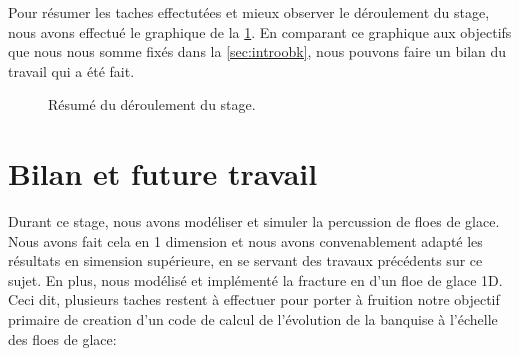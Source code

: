 \vspace*{0.50cm}
Pour résumer les taches effectutées et mieux observer le déroulement du stage, nous avons effectué le graphique de la \cref{fig:timeline}. En comparant ce graphique aux objectifs que nous nous somme fixés dans la \cref{sec:introobk}, nous pouvons faire un bilan du travail qui a été fait.

\begin{figure}[!h]
    \centering
    \caption{Résumé du déroulement du stage.}
    \label{fig:timeline}
\end{figure}








\section{Bilan et future travail}

Durant ce stage, nous avons modéliser et simuler la percussion de floes de glace. Nous avons fait cela en 1 dimension et nous avons convenablement adapté les résultats en simension supérieure, en se servant des travaux précédents sur ce sujet. En plus, nous modélisé et implémenté la fracture en d'un floe de glace 1D. Ceci dit, plusieurs taches restent à effectuer pour porter à fruition notre objectif primaire de creation d'un code de calcul de l’évolution de la banquise à l’échelle des floes de glace:

